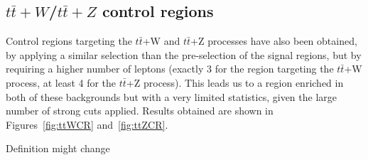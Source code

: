\documentclass[a4paper, 10pt, openright]{report}
\begin{document}
\subsection{$t \bar t + W$/$t \bar t + Z$ control regions} \label{section:ttVCR}

Control regions targeting the $t \bar t$+W and $t \bar t$+Z processes have also been obtained, by applying a similar selection than the pre-selection of the signal regions, but by requiring a higher number of leptons (exactly 3 for the region targeting the $t \bar t$+W process, at least 4 for the $t \bar t$+Z process). This leads us to a region enriched in both of these backgrounds but with a very limited statistics, given the large number of strong cuts applied. Results obtained are shown in Figures~\ref{fig:ttWCR} and~\ref{fig:ttZCR}.

\color{red} Definition might change \color{black}
\end{document}
